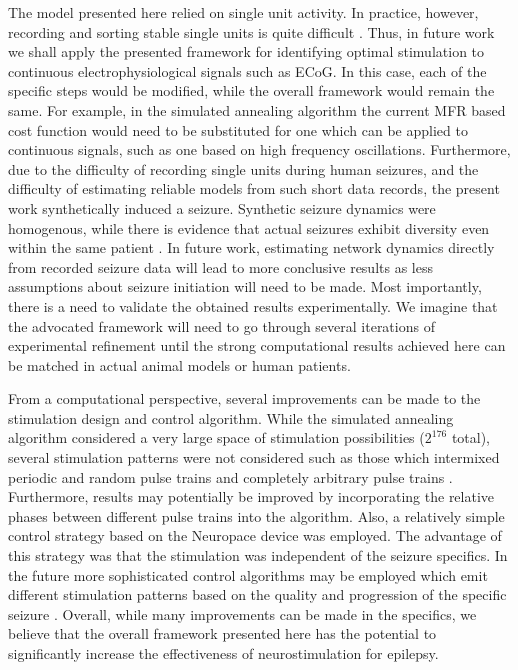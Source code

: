 \documentclass[11pt,a4paper,final]{article}
\begin{document}
The model presented here relied on single unit activity.
In practice, however, recording and sorting stable single units is quite difficult \citep{gilja2012high, dhawale2017automated}. 
Thus, in future work we shall apply the presented framework for identifying optimal stimulation to continuous electrophysiological signals such as ECoG.
In this case, each of the specific steps would be modified, while the overall framework would remain the same.
For example, in the simulated annealing algorithm the current MFR based cost function would need to be substituted for one which can be applied to continuous signals, such as one based on high frequency oscillations.
Furthermore, due to the difficulty of recording single units during human seizures, and the difficulty of estimating reliable models from such short data records, the present work synthetically induced a seizure.
Synthetic seizure dynamics were homogenous, while there is evidence that actual seizures exhibit diversity even within the same patient \citep{bower12,he14}.
In future work, estimating network dynamics directly from recorded seizure data will lead to more conclusive results as less assumptions about seizure initiation will need to be made.
Most importantly, there is a need to validate the obtained results experimentally.
We imagine that the advocated framework will need to go through several iterations of experimental refinement until the strong computational results achieved here can be matched in actual animal models or human patients.

From a computational perspective, several improvements can be made to the stimulation design and control algorithm.
While the simulated annealing algorithm considered a very large space of stimulation possibilities ($2^{176}$ total), several stimulation patterns were not considered such as those which intermixed periodic and random pulse trains and completely arbitrary pulse trains \citep{grill14patent2,brocker17}.
Furthermore, results may potentially be improved by incorporating the relative phases between different pulse trains into the algorithm.
Also, a relatively simple control strategy based on the Neuropace device was employed.
The advantage of this strategy was that the stimulation was independent of the seizure specifics.
In the future more sophisticated control algorithms may be employed which emit different stimulation patterns based on the quality and progression of the specific seizure \citep{ching12,kalitzin14,ehrens15, tsakalis2006control, tsakalis2006feedback, jassemidis2012pacemaker, schiff2012neural}.
Overall, while many improvements can be made in the specifics, we believe that the overall framework presented here has the potential to significantly increase the effectiveness of neurostimulation for epilepsy.
\end{document}

